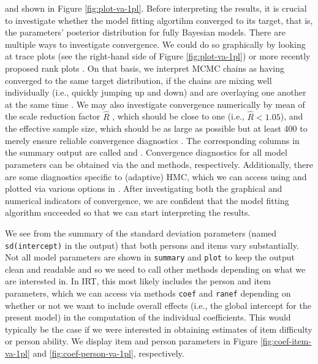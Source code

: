 \documentclass[jss]{jss}
\begin{document}
and shown in Figure \ref{fig:plot-va-1pl}. Before interpreting the
results, it is crucial to investigate whether the model fitting
algortihm converged to its target, that is, the parameters' posterior
distribution for fully Bayesian models. There are multiple ways to
investigate convergence. We could do so graphically by looking at trace
plots (see the right-hand side of Figure \ref{fig:plot-va-1pl}) or more
recently proposed rank plots \citep{vehtari2019}. On that basis, we
interpret MCMC chains as having converged to the same target
distribution, if the chains are mixing well individually (i.e., quickly
jumping up and down) and are overlaying one another at the same time
\citep{gelman2014}. We may also investigate convergence numerically by
mean of the scale reduction factor \(\widehat{R}\)
\citep{gelman1992, gelman2014, vehtari2019}, which should be close to
one (i.e., \(\widehat{R} < 1.05\)), and the effective sample size, which
should be as large as possible but at least 400 to merely ensure
reliable convergence diagnostics \citep{vehtari2019}. The corresponding
columns in the summary output are called  and
. Convergence diagnostics for all model parameters can
be obtained via the  and  methods,
respectively. Additionally, there are some diagnostics specific to
(adaptive) HMC, which we can access using  and plotted
via various options in . After investigating both the
graphical and numerical indicators of convergence, we are confident that
the model fitting algorithm succeeded so that we can start interpreting
the results.

We see from the summary of the standard deviation parameters (named
\texttt{sd(intercept)} in the output) that both persons and items vary
substantially. Not all model parameters are shown in \texttt{summary}
and \texttt{plot} to keep the output clean and readable and so we need
to call other methods depending on what we are interested in. In IRT,
this most likely includes the person and item parameters, which we can
access via methods \texttt{coef} and \texttt{ranef} depending on whether
or not we want to include overall effects (i.e., the global intercept
for the present model) in the computation of the individual
coefficients. This would typically be the case if we were interested in
obtaining estimates of item difficulty or person ability. We display
item and person parameters in Figure \ref{fig:coef-item-va-1pl} and
\ref{fig:coef-person-va-1pl}, respectively.
\end{document}
